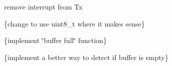 
\begin{DoxyRefList}
\item[\label{todo__todo000001}%
\hypertarget{todo__todo000001}{}%
Member \hyperlink{Node1_2src_2uart_8c_ae386730179b92f3cd381054196cc0751}{I\+SR} (U\+S\+A\+R\+T0\+\_\+\+T\+X\+C\+\_\+vect)]remove interrupt from Tx  
\item[\label{todo__todo000002}%
\hypertarget{todo__todo000002}{}%
Member \hyperlink{Node1_2src_2uart_8h_af7b899691fa46afc4d24937667462b08}{uart\+\_\+out} ]\{change to use uint8\+\_\+t where it makes sense\} 

\{implement \char`\"{}buffer full\char`\"{} function\}  
\item[\label{todo__todo000003}%
\hypertarget{todo__todo000003}{}%
Member \hyperlink{Node1_2src_2uart_8h_a1127aebe7441e1cc25f738127c53c4a3}{uart\+\_\+recv} ()]\{implement a better way to detect if buffer is empty\} 
\end{DoxyRefList}
